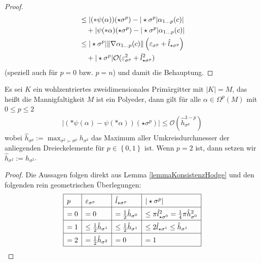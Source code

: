 \begin{proof}
\begin{align}
          &\le \left| (*\psi(\alpha))(\star\sigma^{p}) - |\star\sigma^{p}|\alpha_{1 \ldots p}(c)\right| \\  
          &\quad     +\left|\psi(*\alpha)(\star\sigma^{p}) - |\star\sigma^{p}|\alpha_{1 \ldots p}(c)\right| \\
          &\le |\star\sigma^{p}| \|\nabla\alpha_{1 \ldots p}(c)\| \left(\varepsilon_{\sigma^{p}} + \hat{l}_{\star\sigma^{p}}\right)   \\
          &\quad      + |\star\sigma^{p}|\mathcal{O}(\varepsilon_{\sigma^{p}}^{2} + \hat{l}_{\star\sigma^{p}}^{2})
    \end{align}
    (speziell auch für \( p=0 \) bzw. \( p=n \)) und damit die Behauptung.
  \end{proof}

  \begin{satz}
    Es sei \( K \) ein wohlzentriertes zweidimensionales Primärgitter mit \( |K| = M \), das heißt die Mannigfaltigkeit \( M \) ist ein Polyeder, dann gilt
    für alle \( \alpha\in\Omega^{p}(M) \) mit \( 0\le p \le 2 \)
    \begin{align}
      \left| \left( *\psi(\alpha) - \psi(*\alpha) \right)(\star\sigma^{p})\right| \le \mathcal{O}\left(\hat{h}_{\sigma^{p}}^{3-p}\right)
    \end{align}
    wobei \(\hat{h}_{\sigma^{p}}:=\max_{\sigma^{2}\succ\sigma^{p}}h_{\sigma^{2}}  \) das Maximum aller Umkreisdurchmesser der anliegenden Dreieckelemente 
    für \( p\in\left\{ 0,1 \right\} \) ist. Wenn \( p=2 \) ist,  dann setzen wir \(\hat{h}_{\sigma^{2}}:= h_{\sigma^{2}}  \).
  \end{satz}
  \begin{proof}
    Die Aussagen folgen direkt aus Lemma \ref{lemmaKonsistenzHodge} und den folgenden rein geometrischen Überlegungen:\\
    \begin{align}
      \label{tabGeometrischeGroessen}
      \renewcommand{\arraystretch}{1.5}
      \begin{array}{|l|l|l|l|} \hline
         p  &  \eps_{\sigma^{p}}                  &  \hat{l}_{\star\sigma^{p}}              &   |\star\sigma^{p}|  \\\hline
         =0  &  = 0                                &  = \frac{1}{2}\hat{h}_{\sigma^{0}}      &  \le \pi \hat{l}_{\star\sigma^{0}}^{2} = \frac{1}{4} \pi \hat{h}_{\sigma^{0}}^{2} \\\hline
         =1  & \le \frac{1}{2}\hat{h}_{\sigma^{1}} & \le \frac{1}{2}\hat{h}_{\sigma^{1}}     & \le 2 \hat{l}_{\star\sigma^{1}} \le \hat{h}_{\sigma^{1}} \\\hline
         =2  & = \frac{1}{2}\hat{h}_{\sigma^{2}}   & = 0                                     & = 1 \\\hline
      \end{array}
    \end{align}
  \end{proof}
